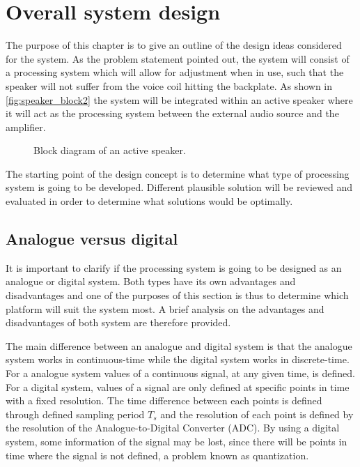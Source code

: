 \chapter{Overall system design}
The purpose of this chapter is to give an outline of the design ideas considered for the system. As the problem statement pointed out, the system will consist of a processing system which will allow for adjustment when in use, such that the speaker will not suffer from the voice coil hitting the backplate. As shown in \autoref{fig:speaker_block2} the system will be integrated within an active speaker where it will act as the processing system between the external audio source and the amplifier.

\begin{figure}[H]
	\centering
	\scalebox{0.9}{
		}
	\caption{Block diagram of an active speaker.}
	\label{fig:speaker_block2}
\end{figure}



The starting point of the design concept is to determine what type of processing system is going to be developed. Different plausible solution will be reviewed and evaluated in order to determine what solutions would be optimally. 


\section{Analogue versus digital}
It is important to clarify if the processing system is going to be designed as an analogue or digital system. Both types have its own advantages and disadvantages and one of the purposes of this section is thus to determine which platform will suit the system most. A brief analysis on the advantages and disadvantages of both system are therefore provided. 

The main difference between an analogue and digital system is that the analogue system works in continuous-time while the digital system works in discrete-time. For a analogue system values of a continuous signal, at any given time, is defined. For a digital system, values of a signal are only defined at specific points in time with a fixed resolution. The time difference between each points is defined through defined sampling period $T_s$ and the resolution of each point is defined by the resolution of the Analogue-to-Digital Converter (ADC). By using a digital system, some information of the signal may be lost, since there will be points in time where the signal is not defined, a problem known as quantization.


